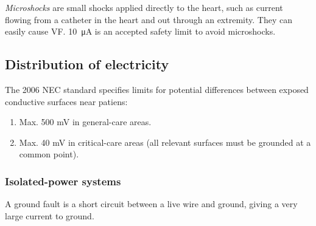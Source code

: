 \emph{Microshocks} are small shocks applied directly to the heart, such as current flowing from a catheter in the heart and out through an extremity. They can easily cause VF. \SI{10}{\micro\ampere} is an accepted safety limit to avoid microshocks.

\subsection{Distribution of electricity}
The 2006 NEC standard specifies limits for potential differences between exposed conductive surfaces near patiens:
\begin{enumerate}
    \item Max. 500 mV in general-care areas.
    \item Max. 40 mV in critical-care areas (all relevant surfaces must be grounded at a common point).
\end{enumerate}

\subsubsection{Isolated-power systems}
A ground fault is a short circuit between a live wire and ground, giving a very large current to ground.
